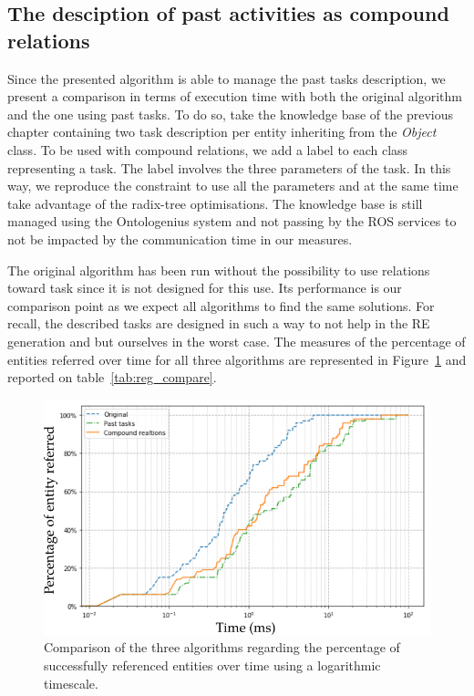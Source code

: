 \subsection{The desciption of past activities as compound relations}

Since the presented algorithm is able to manage the past tasks description, we present a comparison in terms of execution time with both the original algorithm and the one using past tasks. To do so, take the knowledge base of the previous chapter containing two task description per entity inheriting from the \textit{Object} class. To be used with compound relations, we add a label to each class representing a task. The label involves the three parameters of the task. In this way, we reproduce the constraint to use all the parameters and at the same time take advantage of the radix-tree optimisations. The knowledge base is still managed using the Ontologenius system and not passing by the ROS services to not be impacted by the communication time in our measures.

The original algorithm has been run without the possibility to use relations toward task since it is not designed for this use. Its performance is our comparison point as we expect all algorithms to find the same solutions. For recall, the described tasks are designed in such a way to not help in the RE generation and but ourselves in the worst case. The measures of the percentage of entities referred over time for all three algorithms are represented in Figure~\ref{fig:chap7_compare} and reported on table~\ref{tab:reg_compare}.

\begin{figure}[h!]
\centering
\includegraphics[scale=0.5]{figures/chapter7/comparison.png}
\caption{\label{fig:chap7_compare} Comparison of the three algorithms regarding the percentage of successfully referenced entities over time using a logarithmic timescale. }
\end{figure}

